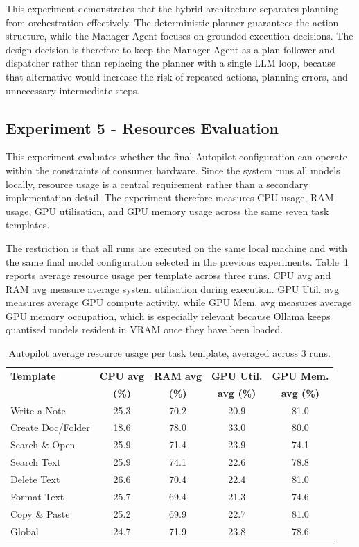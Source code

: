 This experiment demonstrates that the hybrid architecture separates planning from orchestration effectively. The deterministic planner guarantees the action structure, while the Manager Agent focuses on grounded execution decisions. The design decision is therefore to keep the Manager Agent as a plan follower and dispatcher rather than replacing the planner with a single LLM loop, because that alternative would increase the risk of repeated actions, planning errors, and unnecessary intermediate steps.

\subsection{Experiment 5 - Resources Evaluation}
\label{sec:resources_evaluation}
This experiment evaluates whether the final Autopilot configuration can operate within the constraints of consumer hardware. Since the system runs all models locally, resource usage is a central requirement rather than a secondary implementation detail. The experiment therefore measures CPU usage, RAM usage, GPU utilisation, and GPU memory usage across the same seven task templates.

The restriction is that all runs are executed on the same local machine and with the same final model configuration selected in the previous experiments. Table~\ref{tab:resource_usage} reports average resource usage per template across three runs. CPU avg and RAM avg measure average system utilisation during execution. GPU Util. avg measures average GPU compute activity, while GPU Mem. avg measures average GPU memory occupation, which is especially relevant because Ollama keeps quantised models resident in VRAM once they have been loaded.

\begin{table}[H]
\centering
\footnotesize
\setlength{\tabcolsep}{4pt}
\begin{tabularx}{\textwidth}{|X|c|c|c|c|}
\hline
\textbf{Template} & \textbf{CPU avg} & \textbf{RAM avg} & \textbf{GPU Util.} & \textbf{GPU Mem.} \\
 & \textbf{(\%)} & \textbf{(\%)} & \textbf{avg (\%)} & \textbf{avg (\%)} \\
\hline
Write a Note      & 25.3 & 70.2 & 20.9 & 81.0 \\
\hline
Create Doc/Folder & 18.6 & 78.0 & 33.0 & 80.0 \\
\hline
Search \& Open   & 25.9 & 71.4 & 23.9 & 74.1 \\
\hline
Search Text       & 25.9 & 74.1 & 22.6 & 78.8 \\
\hline
Delete Text       & 26.6 & 70.4 & 22.4 & 81.0 \\
\hline
Format Text       & 25.7 & 69.4 & 21.3 & 74.6 \\
\hline
Copy \& Paste    & 25.2 & 69.9 & 22.7 & 81.0 \\
\hline
Global            & 24.7 & 71.9 & 23.8 & 78.6 \\
\hline
\end{tabularx}
\caption{Autopilot average resource usage per task template, averaged across 3 runs.}
\label{tab:resource_usage}
\end{table}

